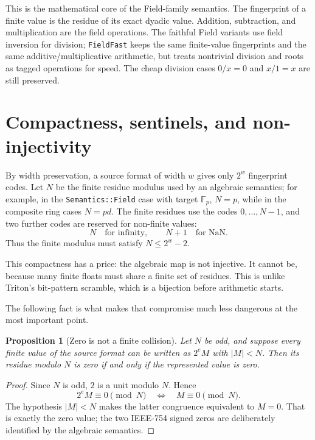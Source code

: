 \documentclass[11pt]{article}
\newcommand{\F}{\mathbb{F}}
\newcommand{\FieldFast}{\texttt{FieldFast}}
\theoremstyle{plain}
\newtheorem{proposition}{Proposition}
\begin{document}
This is the mathematical core of the Field-family semantics.  The fingerprint of
a finite value is the residue of its exact dyadic value.  Addition, subtraction,
and multiplication are the field operations.  The faithful Field variants use
field inversion for division; \FieldFast{} keeps the same finite-value
fingerprints and the same additive/multiplicative arithmetic, but treats
nontrivial division and roots as tagged operations for speed.  The cheap
division cases \(0/x=0\) and \(x/1=x\) are still preserved.

\section{Compactness, sentinels, and non-injectivity}

By width preservation, a source format of width \(w\) gives only \(2^w\)
fingerprint codes.  Let \(N\) be the finite residue modulus used by an algebraic
semantics; for example, in the \texttt{Semantics::Field} case with target
\(\F_p\), \(N=p\), while in the composite ring cases \(N=pd\).  The finite
residues use the codes \(0,\ldots,N-1\), and two further codes are reserved for
non-finite values:
\[
  N \quad\text{for infinity},\qquad N+1 \quad\text{for NaN}.
\]
Thus the finite modulus must satisfy \(N\le 2^w-2\).

This compactness has a price: the algebraic map is not injective.  It cannot be,
because many finite floats must share a finite set of residues.  This is unlike
Triton's bit-pattern scramble, which is a bijection before arithmetic starts.

The following fact is what makes that compromise much less dangerous at the most
important point.

\begin{proposition}[Zero is not a finite collision]
\label{prop:zero}
Let \(N\) be odd, and suppose every finite value of the source format can be
written as \(2^e M\) with \(|M|<N\).  Then its residue modulo \(N\) is zero if
and only if the represented value is zero.
\end{proposition}

\begin{proof}
Since \(N\) is odd, \(2\) is a unit modulo \(N\).  Hence
\[
  2^e M \equiv 0 \pmod N
  \quad\Longleftrightarrow\quad
  M\equiv 0 \pmod N.
\]
The hypothesis \(|M|<N\) makes the latter congruence equivalent to \(M=0\).
That is exactly the zero value; the two IEEE-754 signed zeros are deliberately
identified by the algebraic semantics.
\end{proof}
\end{document}
